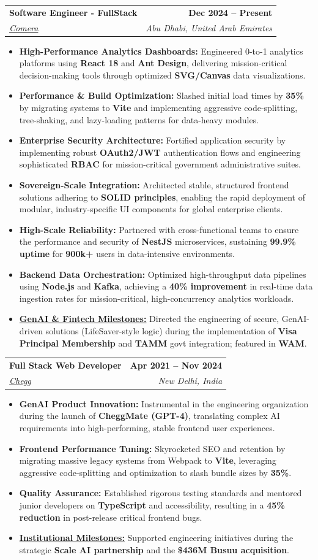 \documentclass[letterpaper,12pt]{article}
\makeatletter
\newcommand{\resumeItem}[1]{
  \item\small{
    {#1}
  }
}
\newcommand{\resumeSubheading}[4]{
  \vspace{4pt}\item
    \begin{tabular*}{1.0\textwidth}[t]{l@{\extracolsep{\fill}}r}
      \textbf{#1} & \textbf{\small #2} \\
      \textit{\small#3} & \textit{\small #4} \\
    \end{tabular*}\vspace{2pt}
}
\newcommand{\resumeItemListStart}{\begin{itemize}}
\newcommand{\resumeItemListEnd}{\end{itemize}\vspace{-2pt}}
\makeatother
\begin{document}
    \resumeSubheading
      {Software Engineer - FullStack}{Dec 2024 -- Present}
      {\href{https://mycomera.com/}{Comera}}{Abu Dhabi, United Arab Emirates}
      \resumeItemListStart
        \resumeItem{\textbf{High-Performance Analytics Dashboards:} Engineered 0-to-1 analytics platforms using \textbf{React 18} and \textbf{Ant Design}, delivering mission-critical decision-making tools through optimized \textbf{SVG/Canvas} data visualizations.}
        \resumeItem{\textbf{Performance \& Build Optimization:} Slashed initial load times by \textbf{35\%} by migrating systems to \textbf{Vite} and implementing aggressive code-splitting, tree-shaking, and lazy-loading patterns for data-heavy modules.}
        \resumeItem{\textbf{Enterprise Security Architecture:} Fortified application security by implementing robust \textbf{OAuth2/JWT} authentication flows and engineering sophisticated \textbf{RBAC} for mission-critical government administrative suites.}
        \resumeItem{\textbf{Sovereign-Scale Integration:} Architected stable, structured frontend solutions adhering to \textbf{SOLID principles}, enabling the rapid deployment of modular, industry-specific UI components for global enterprise clients.}
        \resumeItem{\textbf{High-Scale Reliability:} Partnered with cross-functional teams to ensure the performance and security of \textbf{NestJS} microservices, sustaining \textbf{99.9\% uptime} for \textbf{900k+} users in data-intensive environments.}
        \resumeItem{\textbf{Backend Data Orchestration:} Optimized high-throughput data pipelines using \textbf{Node.js} and \textbf{Kafka}, achieving a \textbf{40\% improvement} in real-time data ingestion rates for mission-critical, high-concurrency analytics workloads.}
        \resumeItem{\textbf{\href{https://jaseem8.github.io/\#comera}{GenAI \& Fintech Milestones:}} Directed the engineering of secure, GenAI-driven solutions (LifeSaver-style logic) during the implementation of \textbf{Visa Principal Membership} and \textbf{TAMM} govt integration; featured in \textbf{WAM}.}
      \resumeItemListEnd

    \resumeSubheading
      {Full Stack Web Developer}{Apr 2021 -- Nov 2024}
      {\href{https://www.chegg.com/}{Chegg}}{New Delhi, India}
      \resumeItemListStart
        \resumeItem{\textbf{GenAI Product Innovation:} Instrumental in the engineering organization during the launch of \textbf{CheggMate (GPT-4)}, translating complex AI requirements into high-performing, stable frontend user experiences.}
        \resumeItem{\textbf{Frontend Performance Tuning:} Skyrocketed SEO and retention by migrating massive legacy systems from Webpack to \textbf{Vite}, leveraging aggressive code-splitting and optimization to slash bundle sizes by \textbf{35\%}.}
        \resumeItem{\textbf{Quality Assurance:} Established rigorous testing standards and mentored junior developers on \textbf{TypeScript} and accessibility, resulting in a \textbf{45\% reduction} in post-release critical frontend bugs.}
        \resumeItem{\textbf{\href{https://jaseem8.github.io/\#chegg}{Institutional Milestones:}} Supported engineering initiatives during the strategic \textbf{Scale AI partnership} and the \textbf{\$436M Busuu acquisition}.}
      \resumeItemListEnd
\end{document}
